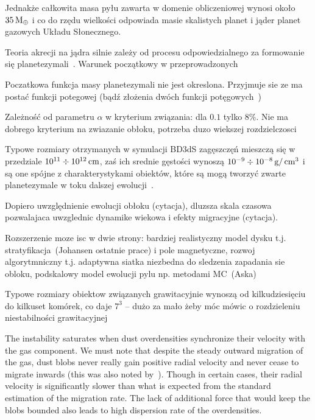 Jednakże całkowita masa pyłu zawarta w domenie obliczeniowej wynosi około
$35\hbox{$\mathrm{\thinspace M_{\oplus}}$}$ i co do rzędu wielkości odpowiada masie skalistych planet i jąder
planet gazowych Układu Słonecznego.

\par Teoria akrecji na jądra silnie zależy od procesu odpowiedzialnego za
formowanie się planetezymali~\cite{HBP13}. Warunek początkowy w przeprowadzonych 

Poczatkowa funkcja masy planetezymali nie jest okreslona. Przyjmuje sie ze ma
postać funkcji potegowej (bądź złożenia dwóch funkcji potęgowych~\cite{R03})

Zależność od parametru $\alpha$ w kryterium związania: dla $0.1$ tylko $8\%$.
Nie ma dobrego kryterium na zwiazanie obłoku, potrzeba duzo wiekszej rozdzielczosci

Typowe rozmiary otrzymanych w symulacji BD3dS zagęszczęń mieszczą się w
przedziale $10^{11} \div 10^{12}\hbox{$\thinspace\textrm{cm}$}$, zaś ich srednie gęstości wynoszą $10^{-9}
\div 10^{-8}\hbox{$\thinspace\textrm{g}$}/\hbox{$\thinspace\textrm{cm}$}^3$ i są one spójne z charakterystykami obiektów, które są
mogą tworzyć zwarte planetezymale w toku dalszej ewolucji~\cite{HS08}.

Dopiero uwzględnienie ewolucji obłoku (cytacja), dluzsza skala czasowa
pozwalajaca uwzglednic dynamike wiekowa i efekty migracyjne (cytacja).

Rozszerzenie moze isc w dwie strony: bardziej realistyczny model dysku t.j.
stratyfikacja~(Johansen ostatnie prace) i pole magnetyczne, rozwoj
algorytmniczny t.j. adaptywna siatka niezbedna do sledzenia zapadania sie
obloku, podskalowy model ewolucji pylu np.  metodami MC~(Aska)

Typowe rozmiary obiektow związanych grawitacyjnie wynoszą od kilkudziesięciu do
kilkuset komórek, co daje $7^3$ -- dużo za mało żeby móc mówic o rozdzieleniu
niestabilności grawitacyjnej

\par The instability saturates when dust overdensities synchronize their
velocity with the gas component. We must note that despite the steady outward
migration of the gas, dust blobs never really gain positive radial velocity and
never cease to migrate inwards (this was also noted by~\cite{JY07}). Though in
certain cases, their radial velocity is significantly slower than what is
expected from the standard estimation of the migration rate. The lack of
additional force that would keep the blobs bounded also leads to high dispersion
rate of the overdensities.


